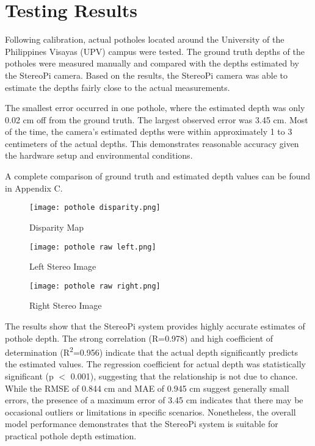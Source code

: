 \section{Testing Results}

Following calibration, actual potholes located around the University of the Philippines Visayas (UPV) campus were tested. The ground truth depths of the potholes were measured manually and compared with the depths estimated by the StereoPi camera. Based on the results, the StereoPi camera was able to estimate the depths fairly close to the actual measurements. 

The smallest error occurred in one pothole, where the estimated depth was only 0.02 cm off from the ground truth. The largest observed error was 3.45 cm. Most of the time, the camera’s estimated depths were within approximately 1 to 3 centimeters of the actual depths. This demonstrates reasonable accuracy given the hardware setup and environmental conditions. 

A complete comparison of ground truth and estimated depth values can be found in Appendix C.



\begin{figure}[htbp]
	\centering
	\begin{minipage}{0.32\textwidth}
		\centering
		\texttt{[image: pothole disparity.png]}
		\caption{Disparity Map}
		\label{fig:image1}
	\end{minipage}
	\hfill
	\begin{minipage}{0.32\textwidth}
		\centering
		\texttt{[image: pothole raw left.png]}
		\caption{Left Stereo Image}
		\label{fig:image2}
	\end{minipage}
	\hfill
	\begin{minipage}{0.32\textwidth}
		\centering
		\texttt{[image: pothole raw right.png]}
		\caption{Right Stereo Image}
		\label{fig:image3}
	\end{minipage}
\end{figure}


The results show that the StereoPi system provides highly accurate estimates of pothole depth. The strong correlation (R=0.978) and high coefficient of determination (R\textsuperscript{2}=0.956) indicate that the actual depth significantly predicts the estimated values. The regression coefficient for actual depth was statistically significant (p $<$ 0.001), suggesting that the relationship is not due to chance. While the RMSE of 0.844 cm and MAE of 0.945 cm suggest generally small errors, the presence of a maximum error of 3.45 cm indicates that there may be occasional outliers or limitations in specific scenarios. Nonetheless, the overall model performance demonstrates that the StereoPi system is suitable for practical pothole depth estimation.

